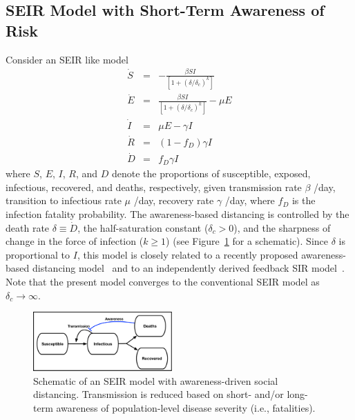 \subsection{SEIR Model with Short-Term Awareness of Risk}
Consider an SEIR like model
\begin{eqnarray}
\dot{S} &=& -\frac{\beta SI}{\left[1+\left(\delta/\delta_c\right)^{k}\right]}\\
\dot{E} &=& \frac{\beta SI}{\left[1+\left(\delta/\delta_c\right)^{k}\right]}-\mu E\\
\dot{I} &=& \mu E-\gamma I \\
\dot{R} &=& (1-f_D)\gamma I\\
\dot{D} &=& f_D\gamma I
\end{eqnarray}
where $S$, $E$, $I$, $R$, and $D$ denote the proportions of
susceptible, exposed, infectious, recovered, and deaths, respectively,
given transmission rate $\beta$ /day, transition
to infectious rate $\mu$ /day, recovery rate $\gamma$ /day,
where $f_D$ is the infection fatality probability.
The awareness-based distancing is controlled by 
the death rate $\delta\equiv \dot{D}$,
the half-saturation constant ($\delta_c>0$), and
the sharpness of change in the force of infection ($k\geq 1$)
(see Figure~\ref{fig.schematic} for a schematic).
Since $\delta$ is proportional to $I$, this model is closely related to a recently proposed awareness-based distancing model~\citep{eksin2019systematic}
and to an independently derived feedback SIR model~\citep{franco2020feedback}.
Note that the present
model converges to the conventional SEIR model as $\delta_c\rightarrow \infty$.
\begin{figure}[t!]
\begin{center}
\includegraphics[width=0.475\textwidth]{schematics/plateau_schematic.pdf}
\caption{Schematic of an SEIR model with awareness-driven social distancing.
Transmission is reduced based on short- and/or long-term awareness
of population-level disease severity (i.e., fatalities).
\label{fig.schematic}}
\end{center}

\end{figure}
